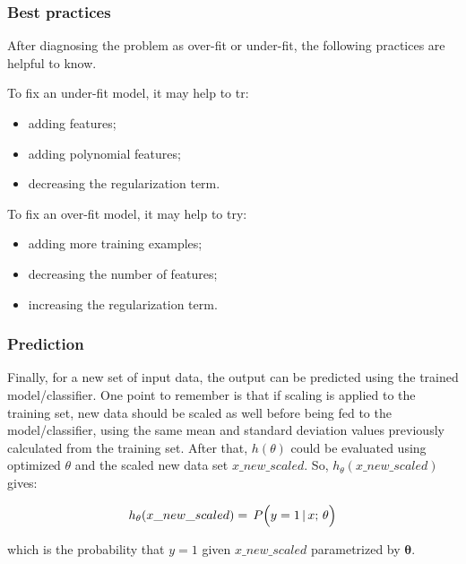 \subsubsection{Best practices}

After diagnosing the problem as over-fit or under-fit, the following practices are helpful to know. 

To fix an under-fit model, it may help to tr:

\begin{itemize}

\item{adding features;}
\item{adding polynomial features;}
\item{decreasing the regularization term.}

\end{itemize}

To fix an over-fit model, it may help to try:

\begin{itemize}

\item{adding more training examples;}
\item{decreasing the number of features;}
\item{increasing the regularization term.}

\end{itemize}

\subsubsection{Prediction}

Finally, for a new set of input data, the output can be predicted using the trained model/classifier. 
One point to remember is that if scaling is applied to the training set, new data should be scaled as well before being fed to the model/classifier, using the same mean and standard deviation values previously calculated from the training set. 
After that, $h(\theta)$ could be evaluated using optimized $\theta$ and the scaled new data set $x\_new\_scaled$. 
So, $h_\theta(x\_new\_scaled)$ gives:

\begin{equation}{\label{eqn:prediction}
h_{\theta}(x\_new\_scaled})
=\,
P\Big(y=1 \, | \, x; \, \theta \Big)
\end{equation} 


which is the probability that $y = 1$ given $x\_new\_scaled$ parametrized by $\bm{\theta}$. 


